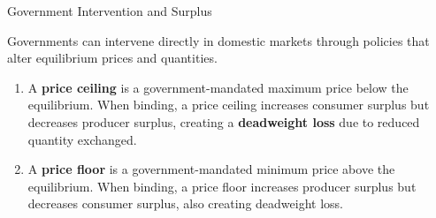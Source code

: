\documentclass[10pt]{article}
\begin{document}
    \begin{core}[label=core:govis]{Government Intervention and Surplus}

      Governments can intervene directly in domestic markets through policies that alter equilibrium prices and quantities. 

      \begin{enumerate}

        \item A \textbf{price ceiling} is a government-mandated maximum price below the equilibrium. When binding, a price ceiling increases consumer surplus but decreases producer surplus, creating a \textbf{deadweight loss} due to reduced quantity exchanged.


        \item A \textbf{price floor} is a government-mandated minimum price above the equilibrium. When binding, a price floor increases producer surplus but decreases consumer surplus, also creating deadweight loss.

\end{enumerate}
\end{core}
\end{document}
